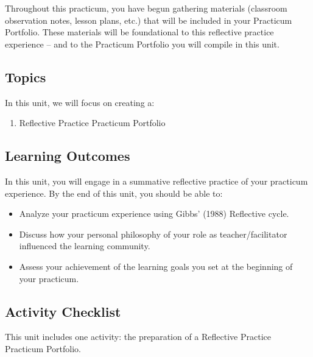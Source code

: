 \documentclass[
]{book}
\providecommand{\tightlist}{%
  \setlength{\itemsep}{0pt}\setlength{\parskip}{0pt}}
\begin{document}
Throughout this practicum, you have begun gathering materials (classroom observation notes, lesson plans, etc.) that will be included in your Practicum Portfolio. These materials will be foundational to this reflective practice experience -- and to the Practicum Portfolio you will compile in this unit.

\hypertarget{topics-5}{%
\subsection*{Topics}\label{topics-5}}

In this unit, we will focus on creating a:

\begin{enumerate}
\def\labelenumi{\arabic{enumi}.}
\tightlist
\item
  Reflective Practice Practicum Portfolio
\end{enumerate}

\hypertarget{learning-outcomes-6}{%
\subsection*{Learning Outcomes}\label{learning-outcomes-6}}

In this unit, you will engage in a summative reflective practice of your practicum experience. By the end of this unit, you should be able to:

\begin{itemize}
\tightlist
\item
  Analyze your practicum experience using Gibbs' (1988) Reflective cycle.\\
\item
  Discuss how your personal philosophy of your role as teacher/facilitator influenced the learning community.\\
\item
  Assess your achievement of the learning goals you set at the beginning of your practicum.
\end{itemize}

\hypertarget{activity-checklist-5}{%
\subsection*{Activity Checklist}\label{activity-checklist-5}}

This unit includes one activity: the preparation of a Reflective Practice Practicum Portfolio.
\end{document}
